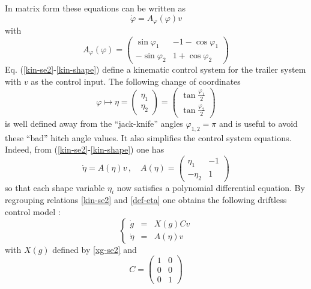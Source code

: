\documentclass[a4paper,twoside]{article}
\begin{document}
In matrix form these equations can be written as
\begin{equation}
\label{kin-shape}
\dot \varphi  =  A_\varphi(\varphi) v
\end{equation}
with
\begin{equation}
\label{defA}
A_\varphi(\varphi) = \begin{pmatrix}
\sin \varphi_1 &  -1-\cos \varphi_1 \\
-\sin \varphi_2 & 1+\cos \varphi_2
\end{pmatrix}
\end{equation}
Eq. (\ref{kin-se2}-\ref{kin-shape}) define a kinematic control system for the trailer system with
$v$ as the control input. 
The following change of coordinates
\begin{equation} \label{eta} 
\varphi \longmapsto \eta = \begin{pmatrix}
\eta_1 \\
\eta_2
\end{pmatrix}
= \begin{pmatrix}
\tan \frac{\varphi_1}{2} \\
\tan \frac{\varphi_2}{2}
\end{pmatrix}
\end{equation}
is well defined away from the ``jack-knife'' angles $\varphi_{1,2}=\pi$ and is useful to avoid these
``bad'' hitch angle values. It also simplifies the control system equations. 
Indeed, from (\ref{kin-se2}-\ref{kin-shape}) one has
\begin{equation}
\label{def-eta}
\dot \eta = A(\eta) v \, , \quad 
A(\eta)= \begin{pmatrix}
\eta_1 & -1 \\
- \eta_2 & 1
\end{pmatrix}
\end{equation}
so that each shape variable $\eta_i$ now satisfies a polynomial differential equation. 
By regrouping relations \eqref{kin-se2} and \eqref{def-eta} one obtains the following driftless control model :
\begin{equation}
\label{mod-cont}
\left \{
\begin{array}{lcl}
\dot g & = & X(g) C v \\
\dot \eta & = & A(\eta) v
\end{array}
\right.
\end{equation}
with $X(g)$ defined by \eqref{xg-se2} and 
\begin{equation}
\label{def-C}
C= \begin{pmatrix}
1 & 0 \\
0 & 0 \\
0 & 1
\end{pmatrix}
\end{equation}
\end{document}
